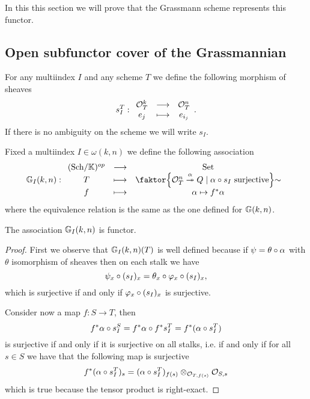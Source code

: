 \bigskip

\noindent In this this section we will prove that the Grassmann scheme represents this functor.

\subsection{Open subfunctor cover of the Grassmannian}
\begin{notation}
For any multiindex $I$ and any scheme $T$ we define the following morphism of sheaves
\[s_I^T:\begin{array}{ccc} {\mathcal{O}_T^k} & \longrightarrow & {\mathcal{O}_T^n}\\ {e_j} & \longmapsto & {e_{i_j}} \end{array}.\]
If there is no ambiguity on the scheme we will write $s_I$.
\end{notation}

\begin{definition}
Fixed a multiindex $I\in \omega(k,n)$ we define the following association
\[\G_I(k,n):\functorDef{(\Sch\K)\op}{\Set}{T}{\quot{\cpa{\Oc_T^n\overset{\al}\onto Q\mid \al\circ s_I\text{ surjective}}}\sim}{f}{\al\mapsto f^\ast \al}\]
where the equivalence relation is the same as the one defined for $\mathbb{G}(k,n)$.
\end{definition}

\begin{remark}
The association $\mathbb{G}_I(k,n)$ is functor.
\end{remark}
\begin{proof}
First we observe that $\mathbb{G}_I(k,n)(T)$ is well defined because if $\psi=\theta\circ \alpha$ with $\theta$ isomorphism of sheaves then on each stalk we have
\[\psi_x\circ (s_I)_x=\theta_x\circ \varphi_x\circ (s_I)_x,\]
which is surjective if and only if $\varphi_x\circ (s_I)_x$ is surjective.
\medskip

\noindent
Consider now a map $f:S\to T$, then
\[f^\ast\alpha \circ s_I^S=f^\ast\alpha\circ f^\ast s_I^T=f^\ast(\alpha\circ s_I^T)\]
is surjective if and only if it is surjective on all stalks, i.e. if and only if for all $s\in S$ we have that the following map is surjective
\[f^\ast(\alpha\circ s_I^T)_s=(\alpha\circ s_I^T)_{f(s)}\otimes_{\mathcal{O}_{T,f(s)}}\mathcal{O}_{S,s}\]
which is true because the tensor product is right-exact.
\end{proof}

